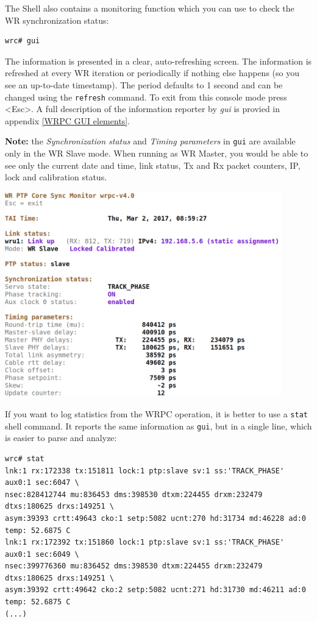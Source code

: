 \documentclass[a4paper, 12pt]{article}
\begin{document}
The Shell also contains a monitoring function which you can use to check the
WR synchronization status:

\begin{lstlisting}
wrc# gui
\end{lstlisting}

The information is presented in a clear, auto-refreshing screen. The
information is refreshed at every WR iteration or periodically if
nothing else happens (so you see an up-to-date timestamp). The period
defaults to 1 second and can be changed using the \texttt{refresh} command. To
exit from this console mode press <Esc>. A full description of the information
reporter by \textit{gui} is provied in appendix \ref{WRPC GUI elements}.

\noindent\textbf{Note:} the \textit{Synchronization status} and \textit{Timing
parameters} in \texttt{gui} are available only in the WR Slave mode. When
running as WR Master, you would be able to see only the current date and time,
link status, Tx and Rx packet counters, IP, lock and calibration status.

\vspace{1em}
\includegraphics[width=12cm]{wrpc_mon.png}
\vspace{1em}

If you want to log statistics from the WRPC operation, it is better to use a
\texttt{stat} shell command. It reports the same information as \texttt{gui},
but in a single line, which is easier to parse and analyze:

\begin{lstlisting}
wrc# stat
lnk:1 rx:172338 tx:151811 lock:1 ptp:slave sv:1 ss:'TRACK_PHASE' aux0:1 sec:6047 \
nsec:828412744 mu:836453 dms:398530 dtxm:224455 drxm:232479 dtxs:180625 drxs:149251 \
asym:39393 crtt:49643 cko:1 setp:5082 ucnt:270 hd:31734 md:46228 ad:0 temp: 52.6875 C
lnk:1 rx:172392 tx:151860 lock:1 ptp:slave sv:1 ss:'TRACK_PHASE' aux0:1 sec:6049 \
nsec:399776360 mu:836452 dms:398530 dtxm:224455 drxm:232479 dtxs:180625 drxs:149251 \
asym:39392 crtt:49642 cko:2 setp:5082 ucnt:271 hd:31730 md:46211 ad:0 temp: 52.6875 C
(...)
\end{lstlisting}
\end{document}
